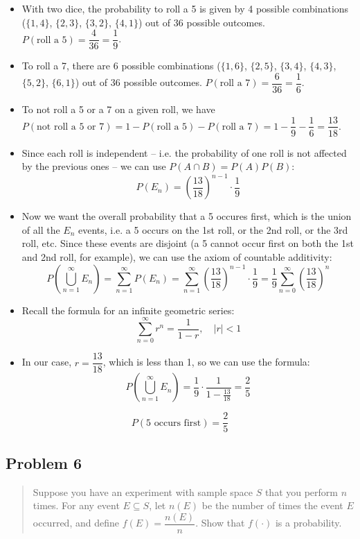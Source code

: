 \documentclass[10pt]{article}
\begin{document}
\begin{itemize}
	\item With two dice, the probability to roll a 5 is given by 4 possible combinations ($\{1,4\}$, $\{2,3\}$, $\{3,2\}$, $\{4,1\}$) out of 36 possible outcomes. $P(\text{roll a 5}) = \dfrac{4}{36} = \dfrac{1}{9}$.
	\item To roll a 7, there are 6 possible combinations ($\{1,6\}$, $\{2,5\}$, $\{3,4\}$, $\{4,3\}$, $\{5,2\}$, $\{6,1\}$) out of 36 possible outcomes. $P(\text{roll a 7}) = \dfrac{6}{36} = \dfrac{1}{6}$.
	\item To not roll a 5 or a 7 on a given roll, we have $P(\text{not roll a 5 or 7}) = 1 - P(\text{roll a 5}) - P(\text{roll a 7}) = 1 - \dfrac{1}{9} - \dfrac{1}{6} = \dfrac{13}{18}$.
	\item Since each roll is independent -- i.e. the probability of one roll is not affected by the previous ones -- we can use $P(A\cap B) = P(A)P(B)$:
	      \[
		      P(E_n) = \left(\frac{13}{18}\right)^{n-1} \cdot \frac{1}{9}
	      \]
	\item Now we want the overall probability that a 5 occures first, which is the union of all the $E_n$ events, i.e. a 5 occurs on the 1st roll, or the 2nd roll, or the 3rd roll, etc. Since these events are disjoint (a 5 cannot occur first on both the 1st and 2nd roll, for example), we can use the axiom of countable additivity:
	      \[
		      P\left(\bigcup_{n=1}^\infty E_n\right) = \sum_{n=1}^\infty P(E_n) = \sum_{n=1}^\infty \left(\frac{13}{18}\right)^{n-1} \cdot \frac{1}{9} = \frac{1}{9} \sum_{n=0}^\infty \left(\frac{13}{18}\right)^n
	      \]
	\item Recall the formula for an infinite geometric series:
	      \[
		      \sum_{n=0}^\infty r^n = \frac{1}{1-r}, \quad |r| < 1
	      \]
	\item In our case, $r = \dfrac{13}{18}$, which is less than 1, so we can use the formula:
	      \[
		      P\left(\bigcup_{n=1}^\infty E_n\right) = \frac{1}{9} \cdot \frac{1}{1 - \frac{13}{18}} =\frac{2}{5}
	      \]
\end{itemize}


\[ \boxed{P(\text{5 occurs first}) = \frac{2}{5}} \]



\subsection*{Problem 6}
\begin{quote}
	Suppose you have an experiment with sample space $S$ that you perform $n$ times. For any event $E\subseteq S$, let $n(E)$ be the number of times the event $E$ occurred, and define $f(E)=\dfrac{n(E)}{n}$. Show that $f(\cdot)$ is a probability.
\end{quote}
\end{document}
